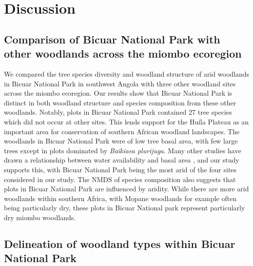 \documentclass[diversity,article,submit,moreauthors,pdftex]{Definitions/mdpi}
\begin{document}

\section{Discussion}

\subsection{Comparison of Bicuar National Park with other woodlands across the miombo ecoregion}

We compared the tree species diversity and woodland structure of arid woodlands in Bicuar National Park in southwest Angola with three other woodland sites across the miombo ecoregion. Our results show that Bicuar National Park is distinct in both woodland structure and species composition from these other woodlands. Notably, plots in Bicuar National Park contained 27 tree species which did not occur at other sites. This lends support for the Hu\'{i}la Plateau as an important area for conservation of southern African woodland landscapes. The woodlands in Bicuar National Park were of low tree basal area, with few large trees except in plots dominated by \textit{Baikiaea plurijuga}. Many other studies have drawn a relationship between water availability and basal area \citep{Terra2018, Strickland2016}, and our study supports this, with Bicuar National Park being the most arid of the four sites considered in our study. The NMDS of species composition also suggests that plots in Bicuar National Park are influenced by aridity. While there are more arid woodlands within southern Africa, with Mopane woodlands for example often being particularly dry, these plots in Bicuar National park represent particularly dry miombo woodlands.

\subsection{Delineation of woodland types within Bicuar National Park}
\end{document}
